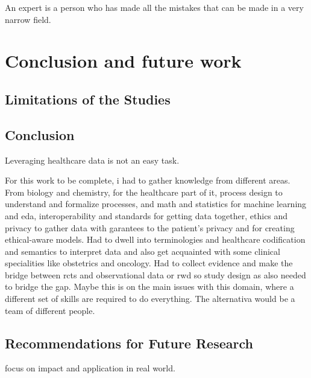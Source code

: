 \begin{savequote}[75mm]
An expert is a person who has made all the mistakes that can be made in a very narrow field.
\end{savequote}
\chapter{Conclusion and future work} \label{chap:conclusion}

\section{Limitations of the Studies}

\section{Conclusion}
Leveraging healthcare data is not an easy task.

For this work to be complete, i had to gather knowledge from different areas. From biology and chemistry, for the healthcare part of it, process design to understand and formalize processes, and math and statistics for machine learning and \ac{eda}, interoperability and standards for getting data together, ethics and privacy to gather data with garantees to the patient's privacy and for creating ethical-aware models. Had to dwell into terminologies and healthcare codification and semantics to interpret data and also get acquainted with some clinical specialities like obstetrics and oncology. Had to collect evidence and make the bridge between \acp{rct} and observational data or \ac{rwd} so study design as also needed to bridge the gap.
Maybe this is on the main issues with this domain, where a different set of skills are required to do everything. The alternativa would be a team of different people.

\section{Recommendations for Future Research}

focus on impact and application in real world. 
